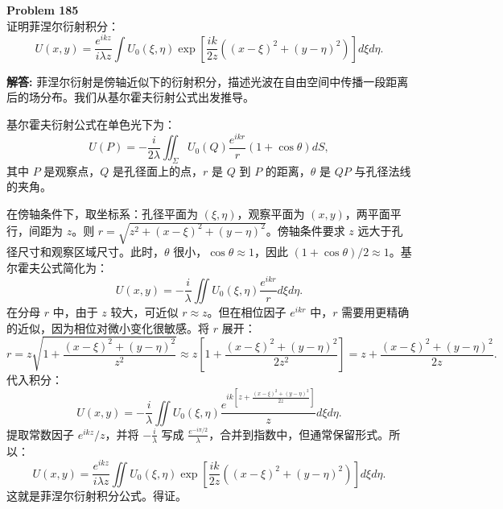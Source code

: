 \documentclass[12pt, a4paper, oneside]{ctexart}
\newenvironment{solution}{\par\noindent\textbf{解答:}\quad}{\par}
\begin{document}
\begin{mdframed}[backgroundcolor=gray!10, linewidth=0pt]
    \textbf{Problem 185} \\
    证明菲涅尔衍射积分：
    \[
    U(x,y) = \frac{e^{i k z}}{i\lambda z} \int U_0(\xi,\eta) \exp\left[ \frac{i k}{2z} \left( (x-\xi)^2 + (y-\eta)^2 \right) \right] d\xi d\eta.
    \]
\end{mdframed}
\begin{solution}
    菲涅尔衍射是傍轴近似下的衍射积分，描述光波在自由空间中传播一段距离后的场分布。我们从基尔霍夫衍射公式出发推导。

    基尔霍夫衍射公式在单色光下为：
    \[
    U(P) = -\frac{i}{2\lambda} \iint_{\Sigma} U_0(Q) \frac{e^{i k r}}{r} (1+\cos\theta) dS,
    \]
    其中 $P$ 是观察点，$Q$ 是孔径面上的点，$r$ 是 $Q$ 到 $P$ 的距离，$\theta$ 是 $QP$ 与孔径法线的夹角。

    在傍轴条件下，取坐标系：孔径平面为 $(\xi, \eta)$，观察平面为 $(x, y)$，两平面平行，间距为 $z$。则 $r = \sqrt{z^2 + (x-\xi)^2 + (y-\eta)^2}$。傍轴条件要求 $z$ 远大于孔径尺寸和观察区域尺寸。此时，$\theta$ 很小，$\cos\theta \approx 1$，因此 $(1+\cos\theta)/2 \approx 1$。基尔霍夫公式简化为：
    \[
    U(x,y) = -\frac{i}{\lambda} \iint U_0(\xi,\eta) \frac{e^{i k r}}{r} d\xi d\eta.
    \]
    在分母 $r$ 中，由于 $z$ 较大，可近似 $r \approx z$。但在相位因子 $e^{i k r}$ 中，$r$ 需要用更精确的近似，因为相位对微小变化很敏感。将 $r$ 展开：
    \[
    r = z \sqrt{1 + \frac{(x-\xi)^2 + (y-\eta)^2}{z^2}} \approx z \left[ 1 + \frac{(x-\xi)^2 + (y-\eta)^2}{2z^2} \right] = z + \frac{(x-\xi)^2 + (y-\eta)^2}{2z}.
    \]
    代入积分：
    \[
    U(x,y) = -\frac{i}{\lambda} \iint U_0(\xi,\eta) \frac{e^{i k [z + \frac{(x-\xi)^2+(y-\eta)^2}{2z}]}}{z} d\xi d\eta.
    \]
    提取常数因子 $e^{i k z}/z$，并将 $-\frac{i}{\lambda}$ 写成 $\frac{e^{-i\pi/2}}{\lambda}$，合并到指数中，但通常保留形式。所以：
    \[
    U(x,y) = \frac{e^{i k z}}{i\lambda z} \iint U_0(\xi,\eta) \exp\left[ \frac{i k}{2z} \left( (x-\xi)^2 + (y-\eta)^2 \right) \right] d\xi d\eta.
    \]
    这就是菲涅尔衍射积分公式。得证。
\end{solution}
\end{document}
